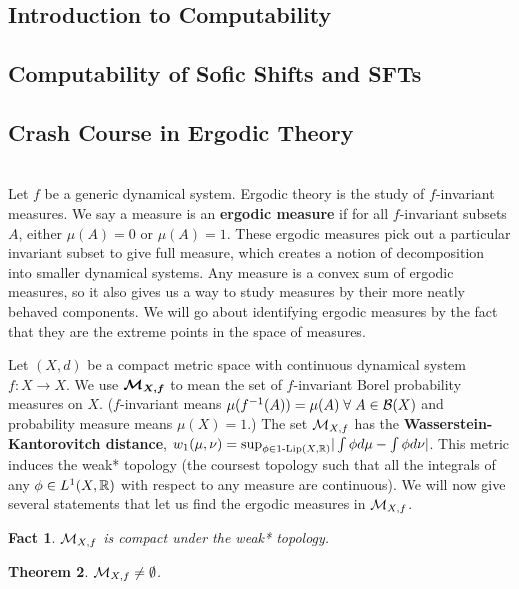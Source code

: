 \documentclass[11pt, reqno]{amsart}
\theoremstyle{plain}
\newtheorem{thm}{Theorem}[section]
\numberwithin{thm}{subsection}
\newtheorem{fact}[thm]{Fact}
\theoremstyle{definition}
\begin{document}
\subsection{Introduction to Computability}\cite[L6, L7]{wolf}   


\subsection{Computability of Sofic Shifts and SFTs}\cite[L7]{wolf}  


\subsection{Crash Course in Ergodic Theory}\cite[L10]{wolf} \\
Let $f$ be a generic dynamical system. Ergodic theory is the study of $f$-invariant measures. We say a measure is an \textbf{ergodic measure} if for all $f$-invariant subsets $A$, either $\mu(A) = 0$ or $\mu(A) = 1$. These ergodic measures pick out a particular invariant subset to give full measure, which creates a notion of decomposition into smaller dynamical systems. Any measure is a convex sum of ergodic measures, so it also gives us a way to study measures by their more neatly behaved components. We will go about identifying ergodic measures by the fact that they are the extreme points in the space of measures. 

Let $(X, d)$ be a compact metric space with continuous dynamical system $f: X \rightarrow X$. We use $\boldsymbol{\mathcal{M}_{X,f}}$ to mean the set of $f$-invariant Borel probability measures on $X$. ($f$-invariant means $\mu(f^{-1}(A)) = \mu(A) \;\forall\; A \in \mathcal{B}(X)$ and probability measure means $\mu(X) = 1$.) The set $\mathcal{M}_{X,f}$ has the \textbf{Wasserstein-Kantorovitch distance}, $w_1(\mu, \nu) = \text{sup}_{\phi \in 1\text{-Lip}(X,\mathbb{R})}|\int \phi d\mu - \int \phi d\nu|$. This metric induces the weak* topology (the coursest topology such that all the integrals of any $\phi \in L^1(X, \mathbb{R})$ with respect to any measure are continuous). We will now give several statements that let us find the ergodic measures in $\mathcal{M}_{X,f}$.

\begin{fact}
  $\mathcal{M}_{X,f}$ is compact under the weak* topology.
\end{fact}

\begin{thm}
  $\mathcal{M}_{X,f} \neq \emptyset$. 
\end{thm}
\end{document}
